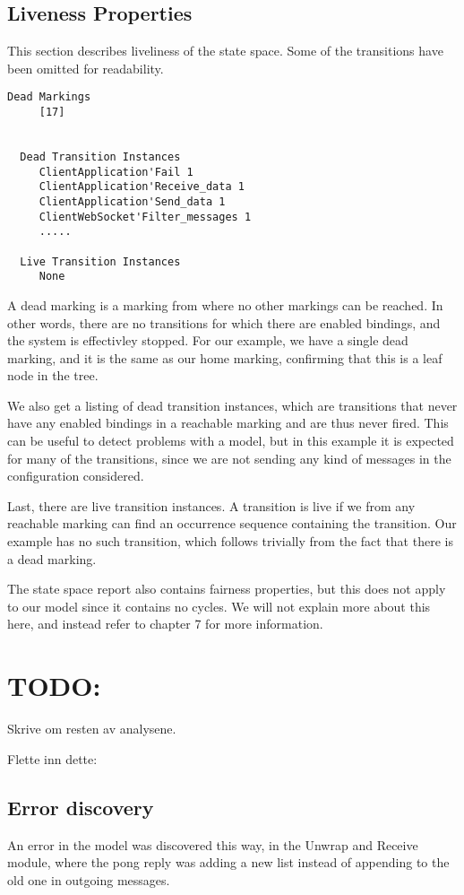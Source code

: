 	\subsection{Liveness Properties}
	This section describes liveliness of the state space. Some of the transitions
	have been omitted for readability.
	
	\begin{lstlisting}[language={}]
  Dead Markings
     [17]


  Dead Transition Instances
     ClientApplication'Fail 1
     ClientApplication'Receive_data 1
     ClientApplication'Send_data 1
     ClientWebSocket'Filter_messages 1
     .....

  Live Transition Instances
     None
	\end{lstlisting}
	
	A dead marking is a marking from where no other markings can be reached.
	 In other words, there are no transitions
	for which there are enabled bindings, and the system is effectivley stopped.
	For our example, we have a single dead marking, and it is the same as our home
	marking, confirming that this is a leaf node in the tree.
	
	We also get a listing of dead transition instances, which are transitions that
	never have any enabled bindings in a reachable marking and are thus never
	fired. This can be useful to detect problems with a model, but in this example
	it is expected for many of the transitions, since we are not sending any kind
	of messages in the configuration considered.
	
	Last, there are live transition instances. A transition is live if we from any
	reachable marking can find an occurrence sequence containing the transition.
	Our example has no such transition, which follows trivially from the fact that
	there is a dead marking.

	The state space report also contains fairness properties, but this does
	not apply to our model since it contains no cycles. We will not explain more
	about this here, and instead refer to \cite{cpn_book} chapter 7 for more
	information.
	
\section{TODO:} 
Skrive om resten av analysene.

Flette inn dette:

\subsection{Error discovery}
An error in the model was discovered this way, in the Unwrap and Receive module,
where the pong reply was adding a new list instead of appending to the old one
in outgoing messages. 

